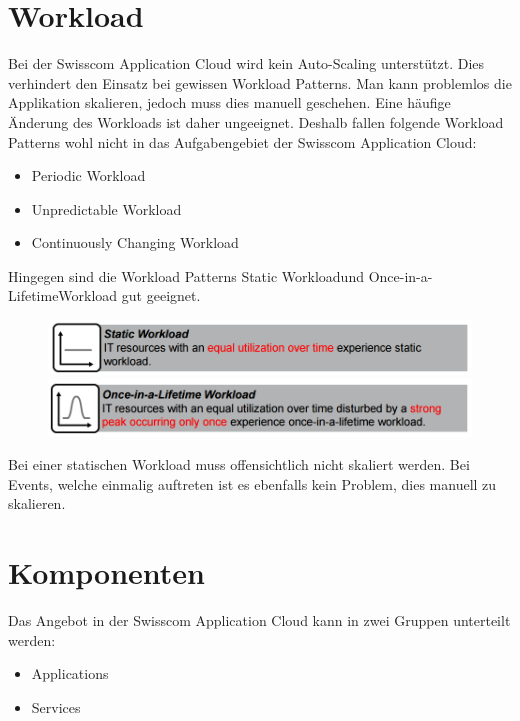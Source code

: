 \section{Workload}
Bei der Swisscom Application Cloud wird kein Auto-Scaling unterstützt. Dies verhindert den Einsatz bei gewissen Workload Patterns. Man kann problemlos die Applikation skalieren, jedoch muss dies manuell geschehen. Eine häufige Änderung des Workloads ist daher ungeeignet. Deshalb fallen folgende Workload Patterns wohl nicht in das Aufgabengebiet der Swisscom Application Cloud:
\begin{itemize}
\item Periodic Workload
\item Unpredictable Workload
\item Continuously Changing Workload
\end{itemize}

Hingegen sind die Workload Patterns \glqq Static Workload\grqq und \glqq Once-in-a-Lifetime\grqq Workload gut geeignet.
\begin{figure}[H]
\centering
\includegraphics[scale=0.6]{images/static-workload.png}

\includegraphics[scale=0.6]{images/once-lifetime.png}
\end{figure}
Bei einer statischen Workload muss offensichtlich nicht skaliert werden. Bei Events, welche einmalig auftreten ist es ebenfalls kein Problem, dies manuell zu skalieren.

\section{Komponenten}
Das Angebot in der Swisscom Application Cloud kann in zwei Gruppen unterteilt werden:
\begin{itemize}
\item Applications
\item Services
\end{itemize}

